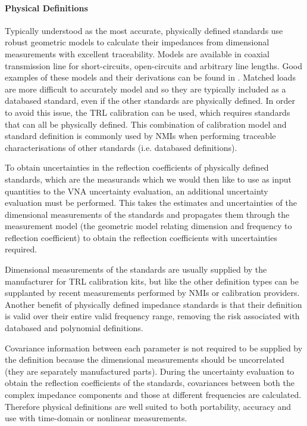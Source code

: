\documentclass[../thesis/thesis.tex]{subfiles}
\begin{document}
\paragraph{Physical Definitions}

Typically understood as the most accurate, physically defined standards use robust geometric models to calculate their impedances from dimensional measurements with excellent traceability. Models are available in coaxial transmission line for short-circuits, open-circuits and arbitrary line lengths. Good examples of these models and their derivations can be found in \cites{Keysight_2016}[Appendix C]{Lewandowski_2010}. Matched loads are more difficult to accurately model and so they are typically included as a databased standard, even if the other standards are physically defined. In order to avoid this issue, the TRL calibration can be used, which requires standards that can all be physically defined. This combination of calibration model and standard definition is commonly used by NMIs when performing traceable characterisations of other standards (i.e. databased definitions).

To obtain uncertainties in the reflection coefficients of physically defined standards, which are the measurands which we would then like to use as input quantities to the VNA uncertainty evaluation, an additional uncertainty evaluation must be performed. This takes the estimates and uncertainties of the dimensional measurements of the standards and propagates them through the measurement model (the geometric model relating dimension and frequency to reflection coefficient) to obtain the reflection coefficients with uncertainties required.

Dimensional measurements of the standards are usually supplied by the manufacturer for TRL calibration kits, but like the other definition types can be supplanted by recent measurements performed by NMIs or calibration providers. Another benefit of physically defined impedance standards is that their definition is valid over their entire valid frequency range, removing the risk associated with databased and polynomial definitions.

Covariance information between each parameter is not required to be supplied by the definition because the dimensional measurements should be uncorrelated (they are separately manufactured parts). During the uncertainty evaluation to obtain the reflection coefficients of the standards, covariances between both the complex impedance components and those at different frequencies are calculated. Therefore physical definitions are well suited to both portability, accuracy and use with time-domain or nonlinear measurements.
\end{document}
